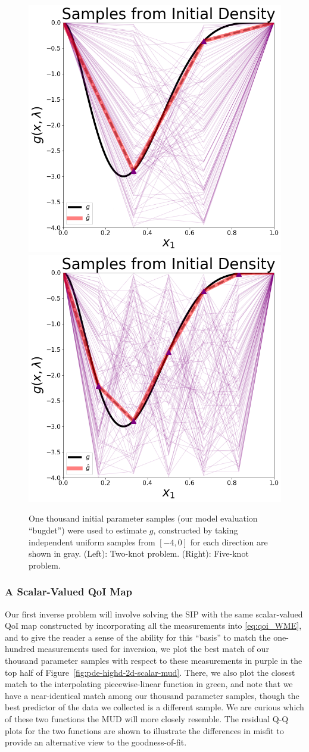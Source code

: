 \begin{figure}
\centering
  \includegraphics[width=0.475\linewidth]{figures/pde-highd/pde-highd_init_D2.png}
  \includegraphics[width=0.475\linewidth]{figures/pde-highd/pde-highd_init_D5.png}
\caption{
One thousand initial parameter samples (our model evaluation ``bugdet'') were used to estimate $g$, constructed by taking independent uniform samples from $[-4, 0]$ for each direction are shown in gray. (Left): Two-knot problem. (Right): Five-knot problem.
}
\label{fig:pde-highd-initial}
\end{figure}

\subsubsection{A Scalar-Valued QoI Map}

Our first inverse problem will involve solving the SIP with the same scalar-valued QoI map constructed by incorporating all the measurements into \eqref{eq:qoi_WME}, and to give the reader a sense of the ability for this ``basis'' to match the one-hundred measurements used for inversion, we plot the best match of our thousand parameter samples with respect to these measurements in purple in the top half of Figure~\ref{fig:pde-highd-2d-scalar-mud}.
There, we also plot the closest match to the interpolating piecewise-linear function in green, and note that we have a near-identical match among our thousand parameter samples, though the best predictor of the data we collected is a different sample.
We are curious which of these two functions the MUD will more closely resemble.
The residual Q-Q plots for the two functions are shown to illustrate the differences in misfit to provide an alternative view to the goodness-of-fit.


